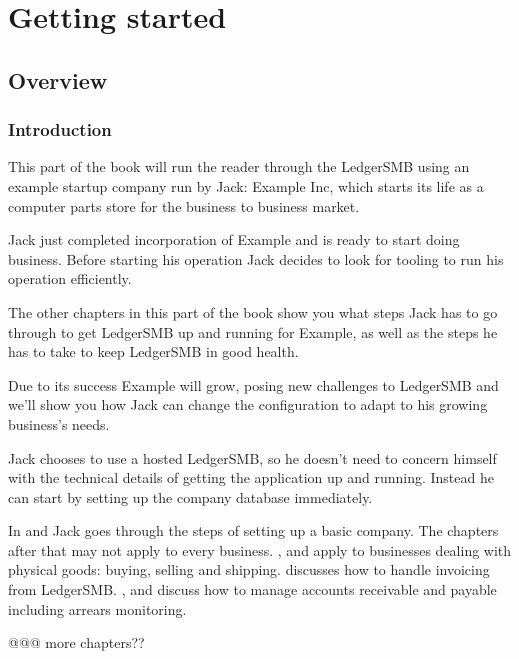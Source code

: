 

\part{Getting started}
\label{part:GettingStarted}

\chapter{Overview}

\section{Introduction}

This part of the book will run the reader through the LedgerSMB using an example
startup company run by Jack: Example Inc, which starts its life as a computer parts
store for the business to business market.

Jack just completed incorporation of Example and is ready to start doing business.
Before starting his operation Jack decides to look for tooling to run his operation
efficiently.

The other chapters in this part of the book show you what steps Jack has to go through
to get LedgerSMB up and running for Example, as well as the steps he has to take to
keep LedgerSMB in good health.

Due to its success Example will grow, posing new challenges to LedgerSMB and we'll show
you how Jack can change the configuration to adapt to his growing business's needs.

Jack chooses to use a hosted LedgerSMB, so he doesn't need to concern himself with the
technical details of getting the application up and running. Instead he can start by setting
up the company database immediately.

In  and  Jack goes through the
steps of setting up a basic company. The chapters after that may not apply to every
business. ,  and
 apply to businesses dealing with physical goods: buying,
selling and shipping.  discusses how to handle invoicing from LedgerSMB.
,  and 
discuss how to manage accounts receivable and payable including arrears monitoring.

@@@ more chapters??

